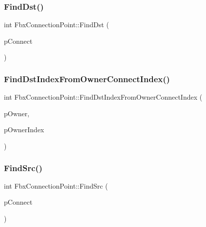 \mbox{\label{class_fbx_connection_point_a3ac484764349d3616dfcbe2c07d4fc27}} 
\subsubsection{\texorpdfstring{Find\+Dst()}{FindDst()}}
{\footnotesize\ttfamily int Fbx\+Connection\+Point\+::\+Find\+Dst (\begin{DoxyParamCaption}\item[{\hyperlink{class_fbx_connection_point}{Fbx\+Connection\+Point} $\ast$}]{p\+Connect }\end{DoxyParamCaption})}

\mbox{\label{class_fbx_connection_point_a6e597c9de1c85034ada54d94bca5a734}} 
\subsubsection{\texorpdfstring{Find\+Dst\+Index\+From\+Owner\+Connect\+Index()}{FindDstIndexFromOwnerConnectIndex()}}
{\footnotesize\ttfamily int Fbx\+Connection\+Point\+::\+Find\+Dst\+Index\+From\+Owner\+Connect\+Index (\begin{DoxyParamCaption}\item[{\hyperlink{class_fbx_connection_point}{Fbx\+Connection\+Point} $\ast$}]{p\+Owner,  }\item[{int}]{p\+Owner\+Index }\end{DoxyParamCaption})\hspace{0.3cm}{\ttfamily [protected]}}

\mbox{\label{class_fbx_connection_point_ae9ca592d1619b4674b4372f89e9b390a}} 
\subsubsection{\texorpdfstring{Find\+Src()}{FindSrc()}}
{\footnotesize\ttfamily int Fbx\+Connection\+Point\+::\+Find\+Src (\begin{DoxyParamCaption}\item[{\hyperlink{class_fbx_connection_point}{Fbx\+Connection\+Point} $\ast$}]{p\+Connect }\end{DoxyParamCaption})}

